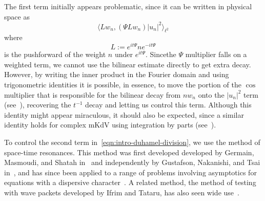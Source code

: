 \documentclass[letterpaper, reqno,final]{amsart}
\newcommand{\discrAvg}{\Psi}
\newcommand{\invLinProp}[1][t]{e^{-i#1\discrAvg}}
\begin{document}
The first term initially appears problematic, since it can be written in physical space as
\begin{equation*}
    \langle Lw_n, (\Psi L w_n)|u_n|^2 \rangle_{\ell^2}
\end{equation*}
where
\begin{equation}\label{eqn:L-def}
    L := e^{it\Psi} n \invLinProp
\end{equation}
is the pushforward of the weight $n$ under $e^{it\Psi}$.  Sincethe $\Psi$ multiplier falls on a weighted term,  we cannot use the bilinear estimate directly to get extra decay.  However, by writing the inner product in the Fourier domain and using trigonometric identities it is possible, in essence, to move the portion of the $\cos$ multiplier that is responsible for the bilinear decay from $nw_n$ onto the $|u_n|^2$ term (see~), recovering the $t^{-1}$ decay and letting us control this term.  Although this identity might appear miraculous, it should also be expected, since a similar identity holds for complex mKdV using integration by parts (see~\cite{stewartLongTimeDecay2021}).

To control the second term in~\eqref{eqn:intro-duhamel-division}, we use the method of space-time resonances.  This method was first developed developed by Germain, Masmoudi, and Shatah in~\cite{germainGlobalSolutions3D2008,germainGlobalSolution2D2012} and independently by Gustafson, Nakanishi, and Tsai in~\cite{gustafsonScatteringTheoryGross2009}, and has since been applied to a range of problems involving asymptotics for equations with a dispersive character~\cite{katoNewProofLongrange2011,ifrimGlobalBoundsCubic2015,germainGlobalExistenceEulerMaxwell2014,germainGlobalExistenceCoupled2011,ionescuGlobalSolutionsQuasilinear2014,ionescuEulerPoissonSystem2013,ionescuNonlinearFractionalSchrodinger2014,elgindiSharpDecayEstimates2015, ionescuGlobalAnalysisModel2016, ionescuGlobalRegularity2d2018}.  A related method, the method of testing with wave packets developed by Ifrim and Tataru, has also seen wide use~\cite{ifrimGlobalBoundsCubic2015,ifrimTwoDimensionalWater2016,harrop-griffithsLongTimeBehavior2016}.
\end{document}
